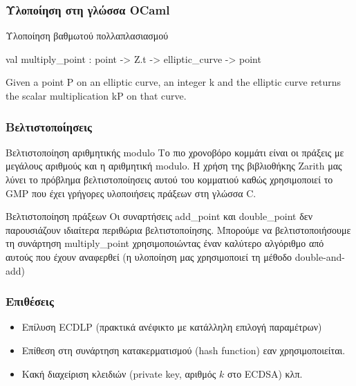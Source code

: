 \documentclass{beamer}
\begin{document}
%
\begin{frame}
\frametitle{Υλοποίηση στη γλώσσα OCaml}
\begin{block}
{Υλοποίηση βαθμωτού πολλαπλασιασμού}
\label{val:Ecc.Ecc.multiply-underscorepoint}\begin{ocamldoccode}
val multiply\_point : point -> Z.t -> elliptic\_curve -> point
\end{ocamldoccode}
\begin{ocamldocdescription}
Given a point P on an elliptic curve, an integer k and the elliptic curve returns the scalar multiplication kP on that curve.
\end{ocamldocdescription}
\end{block}
\end{frame}

%
\begin{frame}
\frametitle{Βελτιστοποίησεις}
\begin{block}
{Βελτιστοποίηση αριθμητικής modulo}
Το πιο χρονοβόρο κομμάτι είναι οι πράξεις με μεγάλους αριθμούς και η αριθμητική modulo. Η χρήση της βιβλιοθήκης Zarith μας λύνει το πρόβλημα βελτιστοποίησεις αυτού του κομματιού καθώς χρησιμοποιεί το GMP που έχει γρήγορες υλοποιήσεις πράξεων στη γλώσσα C.
\end{block}
\begin{block}
{Βελτιστοποίηση πράξεων}
Οι συναρτήσεις add\_point και double\_point δεν παρουσιάζουν ιδιαίτερα περιθώρια βελτιστοποίησης. Μπορούμε να βελτιστοποιήσουμε τη συνάρτηση multiply\_point χρησιμοποιώντας έναν καλύτερο αλγόριθμο από αυτούς που έχουν αναφερθεί (η υλοποίηση μας χρησιμοποιεί τη μέθοδο double-and-add)
\end{block}
\end{frame}

%
\begin{frame}
\frametitle{Επιθέσεις}
\begin{itemize}
\item Επίλυση ECDLP (πρακτικά ανέφικτο με κατάλληλη επιλογή παραμέτρων)
\item Επίθεση στη συνάρτηση κατακερματισμού (hash function) εαν χρησιμοποιείται.
\item  Κακή διαχείριση κλειδιών (private key, αριθμός $k$ στο ECDSA) κλπ.
\end{itemize}
\end{frame}
\end{document}

